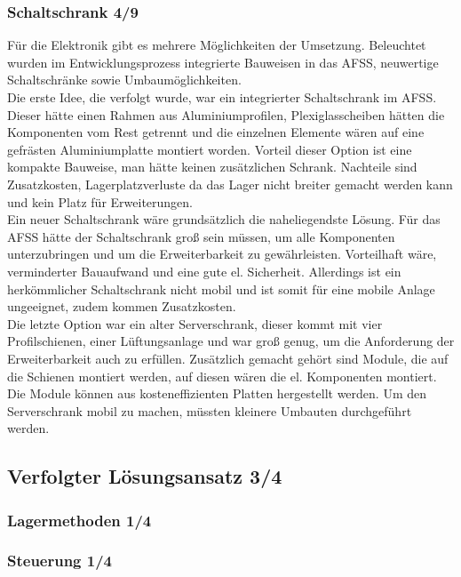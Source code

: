 \subsubsection{Schaltschrank 4/9}
Für die Elektronik gibt es mehrere Möglichkeiten der Umsetzung. Beleuchtet wurden im Entwicklungsprozess integrierte Bauweisen in das AFSS, neuwertige Schaltschränke sowie Umbaumöglichkeiten.\\
Die erste Idee, die verfolgt wurde, war ein integrierter Schaltschrank im AFSS. Dieser hätte einen Rahmen aus Aluminiumprofilen, Plexiglasscheiben hätten die Komponenten vom Rest getrennt und die einzelnen Elemente wären auf eine gefrästen Aluminiumplatte montiert worden. Vorteil dieser Option ist eine kompakte Bauweise, man hätte keinen zusätzlichen Schrank. Nachteile sind Zusatzkosten, Lagerplatzverluste da das Lager nicht breiter gemacht werden kann und kein Platz für Erweiterungen.\\
Ein neuer Schaltschrank wäre grundsätzlich die naheliegendste  Lösung. Für das AFSS hätte der Schaltschrank groß sein müssen, um alle Komponenten unterzubringen und um die Erweiterbarkeit zu gewährleisten. Vorteilhaft wäre, verminderter Bauaufwand und eine gute el. Sicherheit. Allerdings ist ein herkömmlicher Schaltschrank nicht mobil und ist somit für eine mobile Anlage ungeeignet, zudem kommen Zusatzkosten.\\	
Die letzte Option war ein alter Serverschrank, dieser kommt mit vier Profilschienen, einer Lüftungsanlage und war groß genug, um die Anforderung der Erweiterbarkeit auch zu erfüllen. Zusätzlich gemacht gehört sind Module, die auf die Schienen montiert werden, auf diesen wären die el. Komponenten montiert. Die Module können aus kosteneffizienten Platten hergestellt werden. Um den Serverschrank mobil zu machen, müssten kleinere Umbauten durchgeführt werden.




\subsection{Verfolgter Lösungsansatz 3/4}
\subsubsection{Lagermethoden 1/4}


\subsubsection{Steuerung 1/4}


